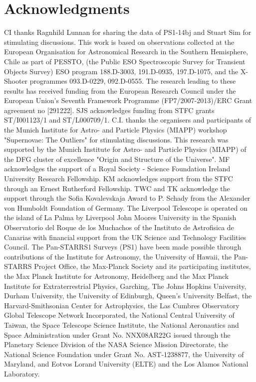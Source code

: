 \documentclass[useAMS,usenatbib]{mn2e}
\begin{document}
\section*{Acknowledgments}
CI thanks Ragnhild Lunnan for sharing the data of PS1-14bj and Stuart Sim for stimulating discussions.
This work is based on observations collected at the European Organisation for Astronomical Research in the Southern Hemisphere, Chile as part of PESSTO, (the Public ESO Spectroscopic Survey for Transient Objects Survey) ESO program 188.D-3003, 191.D-0935, 197.D-1075, and the X-Shooter programmes 093.D-0229, 092.D-0555. 
The research leading to these results has received funding from the European Research Council under the European Union's Seventh Framework Programme (FP7/2007-2013)/ERC Grant agreement no [291222]. SJS acknowledges funding from STFC grants ST/I001123/1 and ST/L000709/1. C.I. thanks the organisers and participants of the Munich Institute for Astro- and Particle Physics (MIAPP) workshop "Supernovae: The Outliers" for stimulating discussions. This research was supported by the Munich Institute for Astro- and Particle Physics (MIAPP) of the DFG cluster of excellence "Origin and Structure of the Universe". MF acknowledges the support of a Royal Society - Science Foundation Ireland University Research Fellowship. KM acknowledges support from the STFC through an Ernest Rutherford Fellowship.  TWC and TK acknowledge the support through the Sofia Kovalevskaja Award to P. Schady from the Alexander von Humboldt Foundation of Germany. The Liverpool Telescope is operated on the island of La Palma by Liverpool John Moores University in the Spanish Observatorio del Roque de los Muchachos of the Instituto de Astrofisica de Canarias with financial support from the UK Science and Technology Facilities Council. The Pan-STARRS1 Surveys (PS1) have been made possible through contributions of the Institute for Astronomy, the University of Hawaii, the Pan-STARRS Project Office, the Max-Planck Society and its participating institutes, the Max Planck Institute for Astronomy, Heidelberg and the Max Planck Institute for Extraterrestrial Physics, Garching, The Johns Hopkins University, Durham University, the University of Edinburgh, Queen's University Belfast, the Harvard-Smithsonian Center for Astrophysics, the Las Cumbres Observatory Global Telescope Network Incorporated, the National Central University of Taiwan, the Space Telescope Science Institute, the National Aeronautics and Space Administration under Grant No. NNX08AR22G issued through the Planetary Science Division of the NASA Science Mission Directorate, the National Science Foundation under Grant No. AST-1238877, the University of Maryland, and Eotvos Lorand University (ELTE) and the Los Alamos National Laboratory.
\end{document}
